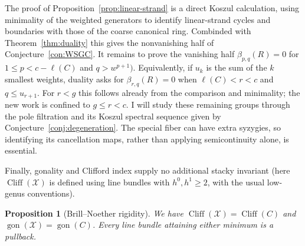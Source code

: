 \documentclass[11pt,reqno]{amsart}
\newtheorem{prop}[lemma]{Proposition}
\theoremstyle{remark}
\newcommand{\Sym}{\operatorname{Sym}} %
\newcommand{\gon}{\operatorname{gon}}
\newcommand{\cliff}{\operatorname{Cliff}}
\newcommand{\cW}{\mathcal{W}}
\newcommand{\cX}{\mathcal{X}}
\begin{document}
The proof of Proposition~\ref{prop:linear-strand} is a direct Koszul calculation, using minimality of the weighted generators to identify linear-strand cycles and boundaries with those of the coarse canonical ring. Combinded with Theorem~\ref{thm:duality} this gives the nonvanishing half of Conjecture~\ref{con:WSGC}.  It remains to prove the vanishing half $\beta_{p,q}(R)=0$ for $1\leq p<c-\ell(C)$ and $q>w^{p+1})$. Equivalently, if $u_k$ is the sum of the $k$ smallest weights, duality asks for $\beta_{r,q}(R)=0$ when $\ell(C)<r<c$ and $q\leq u_{r+1}$. For $r<g$ this follows already from the comparison and minimality; the new work is confined to $g\leq r<c$. I will study these remaining groups through the pole filtration and its Koszul spectral sequence given by Conjecture~\ref{conj:degeneration}. The special fiber can have extra syzygies, so identifying its cancellation maps, rather than applying semicontinuity alone, is essential.



Finally, gonality and Clifford index supply no additional stacky invariant (here $\cliff(\cX)$ is defined using line bundles with $h^0,h^1\geq2$, with the usual low-genus conventions).

\begin{prop}[Brill--Noether rigidity]\label{prop:bn-rigidity}
We have $\cliff(\cX)=\cliff(C)$ and $\gon(\cX)=\gon(C)$. Every line bundle attaining either minimum is a pullback.
\end{prop}
\end{document}
